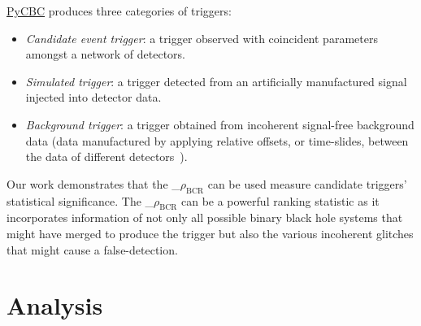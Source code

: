 \documentclass[%
 nofootinbib,
 amsmath,amssymb,
 aps,
 twocolumn,
 superscriptaddress
]{revtex4-2}
\newcommand{\pycbc}{{\sc \href{https://pycbc.org/}{{PyCBC}}}\xspace}
\newcommand{\mathcmd}[1]{{\sc \relax\ifmmode#1\else $#1$\fi}\xspace}
\newcommand{\bcr}{\mathcmd{\rho_\text{BCR}}}
\newcommand{\pycbcstat}{\mathcmd{\rho_\text{PC}}}
\newcommand{\rs}[1]{\textcolor{red}{[RS: #1]}}
\begin{document}
\pycbc produces three categories of triggers: 
\begin{itemize}
    \item \textit{Candidate event trigger}: a trigger observed with coincident parameters amongst a network of detectors. 
    \item \textit{Simulated trigger}: a trigger detected from an artificially manufactured signal injected into detector data.  
    \item \textit{Background trigger}: a trigger obtained from incoherent signal-free background data (data manufactured by applying relative offsets, or time-slides, between the data of different detectors~\cite{pycbc_og6}). 
\end{itemize}


Our work demonstrates that the \bcr can be used measure candidate triggers' statistical significance.  The \bcr can be a powerful ranking statistic as it incorporates information of not only all possible binary black hole systems that might have merged to produce the trigger but also the various incoherent glitches that might cause a false-detection. 

\section{Analysis}\label{sec:Analysis}
\end{document}
